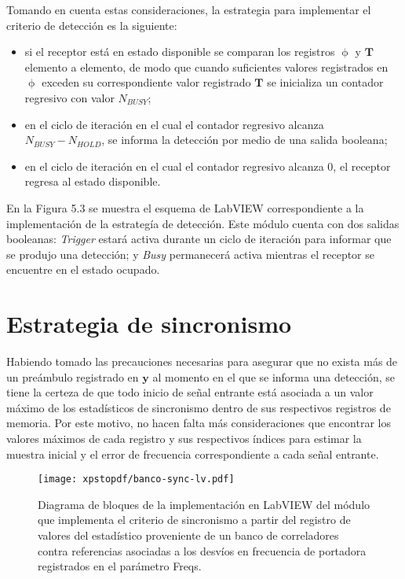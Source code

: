 Tomando en cuenta estas consideraciones, la estrategia para implementar el criterio de detección es la siguiente:
\begin{itemize}
    \item si el receptor está en estado disponible se comparan los registros $\upphi$ y $\mathbf{T}$ elemento a elemento, de modo que cuando suficientes valores registrados en $\upphi$ exceden su correspondiente valor registrado $\mathbf{T}$ se inicializa un contador regresivo con valor $N_{BUSY}$;
    \item en el ciclo de iteración en el cual el contador regresivo alcanza $N_{BUSY}-N_{HOLD}$, se informa la detección por medio de una salida booleana;
    \item en el ciclo de iteración en el cual el contador regresivo alcanza 0, el receptor regresa al estado disponible.
\end{itemize}

En la Figura 5.3 se muestra el esquema de LabVIEW correspondiente a la implementación de la estrategía de detección. Este módulo cuenta con dos salidas booleanas: \textit{Trigger} estará activa durante un ciclo de iteración para informar que se produjo una detección; y \textit{Busy} permanecerá activa mientras el receptor se encuentre en el estado ocupado.

\section{Estrategia de sincronismo}
\label{S:ch5-sincronismo}

Habiendo tomado las precauciones necesarias para asegurar que no exista más de un preámbulo registrado en $\mathbf{y}$ al momento en el que se informa una detección, se tiene la certeza de que todo inicio de señal entrante está asociada a un valor máximo de los estadísticos de sincronismo dentro de sus respectivos registros de memoria. Por este motivo, no hacen falta más consideraciones que encontrar los valores máximos de cada registro y sus respectivos índices para estimar la muestra inicial y el error de frecuencia correspondiente a cada señal entrante.

\begin{figure}[t]
    \centering{}\texttt{[image: xpstopdf/banco-sync-lv.pdf]}
    \caption[Implementación en LabVIEW del criterio de sincronismo a partir del registro del estadístico banco de correladores.]{Diagrama de bloques de la implementación en LabVIEW del módulo que implementa el criterio de sincronismo a partir del registro de valores del estadístico proveniente de un banco de correladores contra referencias asociadas a los desvíos en frecuencia de portadora registrados en el parámetro Freqs.\label{fig:bc-sync-lv}}  
\end{figure}

